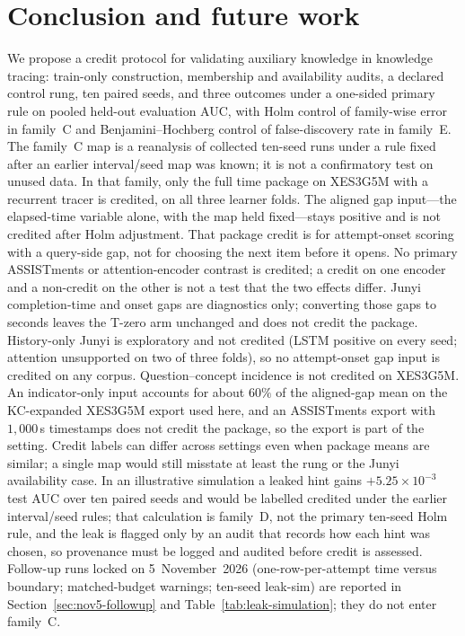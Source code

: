 \documentclass[review,12pt]{elsarticle}
\begin{document}
\section{Conclusion and future work}
\label{sec:conclusion}
We propose a credit protocol for validating auxiliary knowledge in
knowledge tracing: train-only construction, membership and availability
audits, a declared control rung, ten paired seeds, and three outcomes
under a one-sided primary rule on pooled held-out evaluation AUC, with
Holm control of family-wise error in family~C and Benjamini--Hochberg
control of false-discovery rate in family~E. The family~C map is a
reanalysis of collected ten-seed runs under a rule fixed after an
earlier interval/seed map was known; it is not a confirmatory test on
unused data. In that family, only the full time package on XES3G5M with
a recurrent tracer is credited, on all three learner folds. The aligned
gap input---the elapsed-time variable alone, with the map held
fixed---stays positive and is not credited after Holm adjustment. That
package credit is for attempt-onset scoring with a query-side gap, not
for choosing the next item before it opens. No primary ASSISTments or
attention-encoder contrast is credited; a credit on one encoder and a
non-credit on the other is not a test that the two effects differ.
Junyi completion-time and onset gaps are diagnostics only; converting
those gaps to seconds leaves the T-zero arm unchanged and does not
credit the package. History-only
Junyi is exploratory and not credited (LSTM positive on every seed;
attention unsupported on two of three folds), so no attempt-onset gap
input is credited on any corpus. Question--concept incidence is not credited on
XES3G5M. An indicator-only input accounts for about $60\%$ of the
aligned-gap mean on the KC-expanded XES3G5M export used here, and an
ASSISTments export with $1{,}000$\,s timestamps does not credit the
package, so the export is part of the setting. Credit labels can differ
across settings even when package means are similar; a single map would
still misstate at least the rung or the Junyi availability case. In an
illustrative simulation a leaked hint gains $+5.25\times 10^{-3}$
test AUC over ten paired seeds and would be labelled credited under
the earlier interval/seed rules; that calculation is family~D, not the
primary ten-seed Holm rule, and the leak is flagged only by an audit that
records how each hint was chosen, so provenance must be logged and
audited before credit is assessed. Follow-up runs locked on
5~November~2026 (one-row-per-attempt time versus boundary; matched-budget
warnings; ten-seed leak-sim) are reported in
Section~\ref{sec:nov5-followup} and Table~\ref{tab:leak-simulation};
they do not enter family~C.
\end{document}
